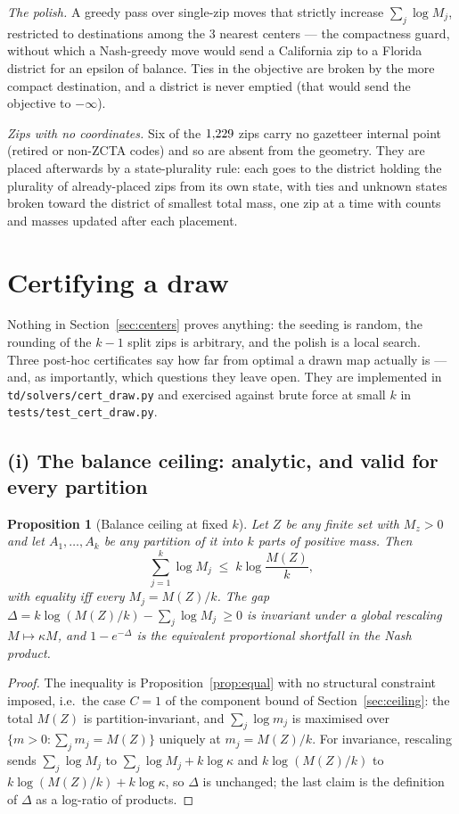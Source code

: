 \documentclass[11pt]{article}
\newtheorem{prop}{Proposition}
\theoremstyle{definition}
\begin{document}
\emph{The polish.} A greedy pass over single-zip moves that strictly increase
$\sum_j\log M_j$, restricted to destinations among the $3$ nearest centers --- the
compactness guard, without which a Nash-greedy move would send a California zip to a Florida
district for an epsilon of balance. Ties in the objective are broken by the more compact
destination, and a district is never emptied (that would send the objective to $-\infty$).

\emph{Zips with no coordinates.} Six of the $1{,}229$ zips carry no gazetteer internal point
(retired or non-ZCTA codes) and so are absent from the geometry. They are placed afterwards
by a state-plurality rule: each goes to the district holding the plurality of already-placed
zips from its own state, with ties and unknown states broken toward the district of smallest
total mass, one zip at a time with counts and masses updated after each placement.

\section{Certifying a draw}\label{sec:certs}

Nothing in Section~\ref{sec:centers} proves anything: the seeding is random, the rounding of
the $k-1$ split zips is arbitrary, and the polish is a local search. Three post-hoc
certificates say how far from optimal a drawn map actually is --- and, as importantly, which
questions they leave open. They are implemented in \texttt{td/solvers/cert\_draw.py} and
exercised against brute force at small $k$ in \texttt{tests/test\_cert\_draw.py}.

\subsection{(i) The balance ceiling: analytic, and valid for every partition}

\begin{prop}[Balance ceiling at fixed $k$]\label{prop:ceilk}
Let $Z$ be any finite set with $M_z>0$ and let $A_1,\dots,A_k$ be any partition of it into
$k$ parts of positive mass. Then
\[
\sum_{j=1}^k \log M_j \;\le\; k\log\frac{M(Z)}{k},
\]
with equality iff every $M_j=M(Z)/k$. The gap
$\Delta=k\log(M(Z)/k)-\sum_j\log M_j\ \ge 0$ is invariant under a global rescaling
$M\mapsto\kappa M$, and $1-e^{-\Delta}$ is the equivalent proportional shortfall in the Nash
\emph{product}.
\end{prop}

\begin{proof}
The inequality is Proposition~\ref{prop:equal} with no structural constraint imposed, i.e.\
the case $C=1$ of the component bound of Section~\ref{sec:ceiling}: the total $M(Z)$ is
partition-invariant, and $\sum_j\log m_j$ is maximised over $\{m>0:\sum_j m_j=M(Z)\}$
uniquely at $m_j=M(Z)/k$. For invariance, rescaling sends $\sum_j\log M_j$ to
$\sum_j\log M_j+k\log\kappa$ and $k\log(M(Z)/k)$ to $k\log(M(Z)/k)+k\log\kappa$, so $\Delta$
is unchanged; the last claim is the definition of $\Delta$ as a log-ratio of products.
\end{proof}
\end{document}
